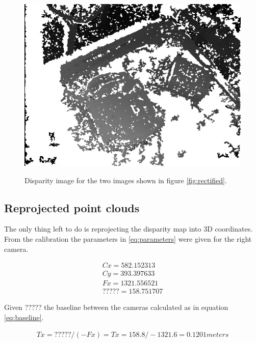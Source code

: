 \begin{figure}[h!]
  \caption{Disparity image for the two images shown in figure \ref{fig:rectified}. }
  \centering
    \includegraphics[scale=0.4]{graphics/06_vision/disparity_example.jpg}
    \label{fig:disparity}
\end{figure}


\subsection{Reprojected point clouds} \label{sec:repro_point}

The only thing left to do is reprojecting the disparity map into 3D coordinates. From the calibration the parameters in \ref{eq:parameters} were given for the right camera.

\begin{equation}\label{eq:parameters}
\begin{split}
Cx = 582.152313 \\
Cy = 393.397633 \\
Fx = 1321.556521 \\
????? = 158.751707 
\end{split}
\end{equation} 

Given  ?????  the baseline between the cameras calculated as in equation \ref{eq:baseline}.

\begin{equation}\label{eq:baseline}
\begin{split}
Tx = ?????/(-Fx) = Tx = 158.8/-1321.6 = 0.1201 meters
\end{split}
\end{equation} 

